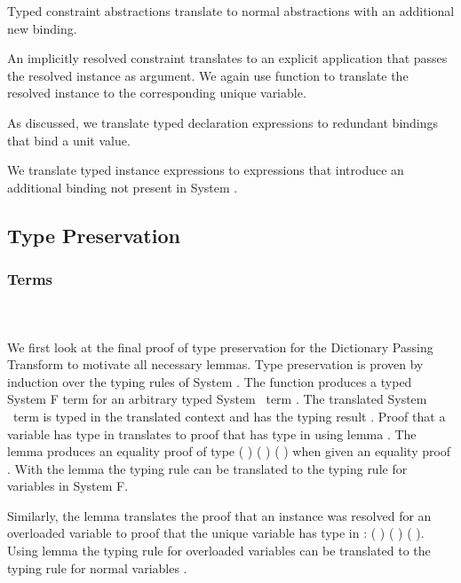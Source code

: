 \noindent Typed constraint abstractions  translate to normal abstractions with an additional new binding. 

\noindent An implicitly resolved constraint  translates to an explicit application that passes the resolved instance  as argument. We again use function  to translate the resolved instance to the corresponding unique variable. 

\noindent As discussed, we translate typed declaration expressions  to redundant  bindings that bind a unit value.

\noindent We translate typed instance expressions  to  expressions that introduce an additional binding not present in System \Fo.

\subsection{Type Preservation}
\subsubsection{Terms}\hfill\\\\
We first look at the final proof of type preservation for the Dictionary Passing Transform to motivate all necessary lemmas. 
Type preservation is proven by induction over the typing rules of System \Fo. 
The function  produces a typed System F term for an arbitrary typed System \Fo\ term . 
The translated System \Fo\ term   is typed in the translated context   and has the typing result  .
\DPTTermPres
Proof  that a variable  has type  in  translates to proof that   has type   in   using lemma . 
The lemma produces an equality proof of type  ( ) ( )  ( ) when given an equality proof      .
With the lemma  the typing rule  can be translated to the typing rule for variables in System F. 

\noindent Similarly, the lemma  translates the proof  that an instance  \Constr{:}  was resolved for an overloaded variable  to proof that the unique variable   has type   in  :  ( ) ( )  ( ).  
Using lemma  the typing rule for overloaded variables  can be translated to the typing rule for normal variables .

